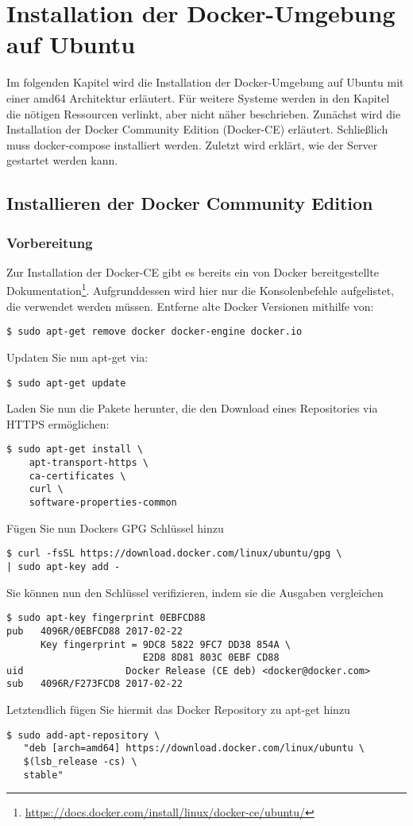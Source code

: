 \chapter{Installation der Docker-Umgebung auf Ubuntu}
\label{chapter:docker_setup}
    Im folgenden Kapitel wird die Installation der Docker-Umgebung auf Ubuntu mit einer amd64 Architektur erläutert.
    Für weitere Systeme werden in den Kapitel die nötigen Ressourcen verlinkt, aber nicht näher beschrieben.
    Zunächst wird die Installation der Docker Community Edition (Docker-CE) erläutert.
    Schließlich muss docker-compose installiert werden.
    Zuletzt wird erklärt, wie der Server gestartet werden kann.
        
    \section{Installieren der Docker Community Edition}
    	\subsection{Vorbereitung}
	        Zur Installation der Docker-CE gibt es bereits ein von Docker bereitgestellte Dokumentation\footnote{\href{https://docs.docker.com/install/linux/docker-ce/ubuntu/}{https://docs.docker.com/install/linux/docker-ce/ubuntu/}}.
    	    Aufgrunddessen wird hier nur die Konsolenbefehle aufgelistet, die verwendet werden müssen.
        	Entferne alte Docker Versionen mithilfe von:
	        \begin{lstlisting}
$ sudo apt-get remove docker docker-engine docker.io
			\end{lstlisting}
			Updaten Sie nun apt-get via:
			\begin{lstlisting}
$ sudo apt-get update
			\end{lstlisting}
			Laden Sie nun die Pakete herunter, die den Download eines Repositories via HTTPS ermöglichen:
			\begin{lstlisting}
$ sudo apt-get install \
    apt-transport-https \
    ca-certificates \
    curl \
    software-properties-common
			\end{lstlisting}
			Fügen Sie nun Dockers GPG Schlüssel hinzu
			\begin{lstlisting}
$ curl -fsSL https://download.docker.com/linux/ubuntu/gpg \
| sudo apt-key add -
			\end{lstlisting}
			Sie können nun den Schlüssel verifizieren, indem sie die Ausgaben vergleichen
			\begin{lstlisting}
$ sudo apt-key fingerprint 0EBFCD88
pub   4096R/0EBFCD88 2017-02-22
      Key fingerprint = 9DC8 5822 9FC7 DD38 854A \
                        E2D8 8D81 803C 0EBF CD88
uid                  Docker Release (CE deb) <docker@docker.com>
sub   4096R/F273FCD8 2017-02-22
			\end{lstlisting}
			Letztendlich fügen Sie hiermit das Docker Repository zu apt-get hinzu
			\begin{lstlisting}
$ sudo add-apt-repository \
   "deb [arch=amd64] https://download.docker.com/linux/ubuntu \
   $(lsb_release -cs) \
   stable"
			\end{lstlisting}
			
